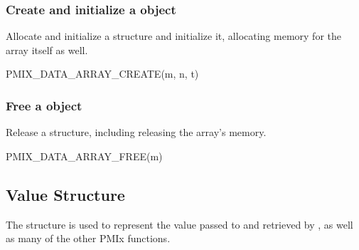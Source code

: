 \begin{arglist}
\end{arglist}

\subsubsection{Create and initialize a  object}

Allocate and initialize a  structure and initialize it, allocating memory for the array itself as well.

\cspecificstart
\begin{codepar}
PMIX_DATA_ARRAY_CREATE(m, n, t)
\end{codepar}
\cspecificend

\begin{arglist}
\end{arglist}


\subsubsection{Free a object}

Release a  structure, including releasing the array's memory.

\cspecificstart
\begin{codepar}
PMIX_DATA_ARRAY_FREE(m)
\end{codepar}
\cspecificend

\begin{arglist}
\end{arglist}

\subsection{Value Structure}

The  structure is used to represent the value passed to  and retrieved by , as well as many of the other \ac{PMIx} functions.

